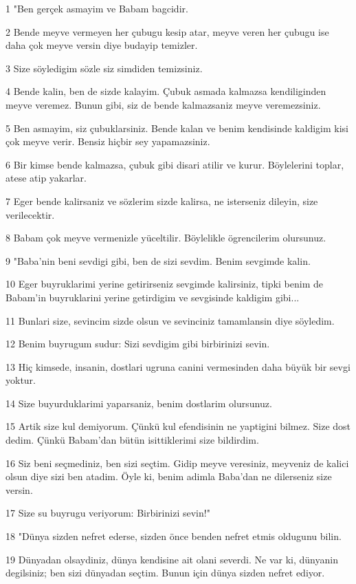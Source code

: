 \par 1 "Ben gerçek asmayim ve Babam bagcidir.
\par 2 Bende meyve vermeyen her çubugu kesip atar, meyve veren her çubugu ise daha çok meyve versin diye budayip temizler.
\par 3 Size söyledigim sözle siz simdiden temizsiniz.
\par 4 Bende kalin, ben de sizde kalayim. Çubuk asmada kalmazsa kendiliginden meyve veremez. Bunun gibi, siz de bende kalmazsaniz meyve veremezsiniz.
\par 5 Ben asmayim, siz çubuklarsiniz. Bende kalan ve benim kendisinde kaldigim kisi çok meyve verir. Bensiz hiçbir sey yapamazsiniz.
\par 6 Bir kimse bende kalmazsa, çubuk gibi disari atilir ve kurur. Böylelerini toplar, atese atip yakarlar.
\par 7 Eger bende kalirsaniz ve sözlerim sizde kalirsa, ne isterseniz dileyin, size verilecektir.
\par 8 Babam çok meyve vermenizle yüceltilir. Böylelikle ögrencilerim olursunuz.
\par 9 "Baba'nin beni sevdigi gibi, ben de sizi sevdim. Benim sevgimde kalin.
\par 10 Eger buyruklarimi yerine getirirseniz sevgimde kalirsiniz, tipki benim de Babam'in buyruklarini yerine getirdigim ve sevgisinde kaldigim gibi...
\par 11 Bunlari size, sevincim sizde olsun ve sevinciniz tamamlansin diye söyledim.
\par 12 Benim buyrugum sudur: Sizi sevdigim gibi birbirinizi sevin.
\par 13 Hiç kimsede, insanin, dostlari ugruna canini vermesinden daha büyük bir sevgi yoktur.
\par 14 Size buyurduklarimi yaparsaniz, benim dostlarim olursunuz.
\par 15 Artik size kul demiyorum. Çünkü kul efendisinin ne yaptigini bilmez. Size dost dedim. Çünkü Babam'dan bütün isittiklerimi size bildirdim.
\par 16 Siz beni seçmediniz, ben sizi seçtim. Gidip meyve veresiniz, meyveniz de kalici olsun diye sizi ben atadim. Öyle ki, benim adimla Baba'dan ne dilerseniz size versin.
\par 17 Size su buyrugu veriyorum: Birbirinizi sevin!"
\par 18 "Dünya sizden nefret ederse, sizden önce benden nefret etmis oldugunu bilin.
\par 19 Dünyadan olsaydiniz, dünya kendisine ait olani severdi. Ne var ki, dünyanin degilsiniz; ben sizi dünyadan seçtim. Bunun için dünya sizden nefret ediyor.
